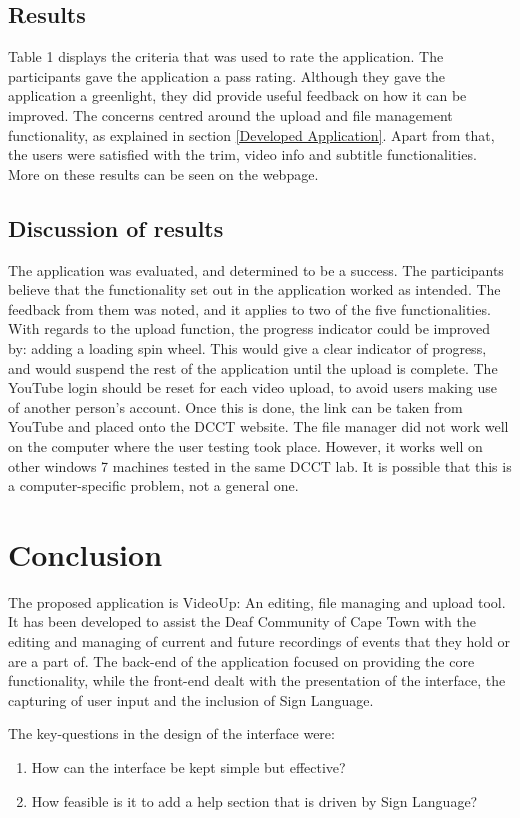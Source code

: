 \documentclass{sig-alternate-05-2015}
\begin{document}
\subsection*{Results}
Table 1 displays the criteria that was used to rate the application. The participants gave the application a pass rating. Although they gave the application a greenlight, they did provide useful feedback on how it can be improved. The concerns centred around the upload and file management functionality, as explained in section \ref{Developed 
Application}. Apart from that, the users were satisfied with the trim, video info and subtitle functionalities. More on these results can be seen on the webpage.

\subsection*{Discussion of results}
The application was evaluated, and determined to be a success. The participants believe that the functionality set out in the application worked as intended. The feedback from them was noted, and it applies to two of the five functionalities. With regards to the upload function, the progress indicator could be improved by: adding a loading spin wheel. This would give a clear indicator of progress, and would suspend the rest of the application until the upload is complete. The YouTube login should be reset for each video upload, to avoid users making use of another person's account. Once this is done, the link can be taken from YouTube and placed onto the DCCT website. The file manager did not work well on the computer where the user testing took place. However, it works well on other windows 7 machines tested in the same DCCT lab. It is possible that this is a computer-specific problem, not a general one.

\section{Conclusion}
The proposed application is VideoUp: An editing, file managing and upload tool. It has been developed to assist the Deaf Community of Cape Town with the editing and managing of current and future recordings of events that they hold or are a part of. The back-end of the application focused on providing the core functionality, while the front-end dealt with the presentation of the interface, the capturing of user input and the inclusion of Sign Language.

The key-questions in the design of the interface were:
\begin{enumerate}
  \item How can the interface be kept simple but effective?
  \item How feasible is it to add a help section that is driven by Sign Language?
\end{enumerate}
\end{document}
